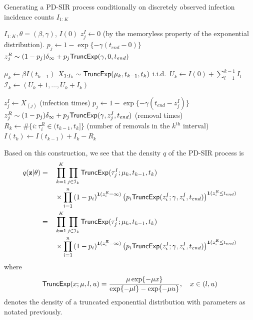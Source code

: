 \documentclass[11pt]{article}
\begin{document}
	\begin{algorithm}
		\caption{Generating a PD-SIR process conditionally on discretely observed infection incidence counts $I_{1:K}$}
		\label{alg:PD-SIR}
		\begin{algorithmic}
			\REQUIRE $I_{1:K}, \theta = (\beta, \gamma)$, $I(0)$
			\STATE $z^I_j \leftarrow 0$ (by the memoryless property of the exponential distribution).
			\STATE $p_j \leftarrow 1 - \exp\{-\gamma (t_{end} - 0)\}$
			\STATE $z^R_j \sim (1 - p_j) \delta_\infty + p_j \textsf{TruncExp}(\gamma, 0, t_{end})$
			\ENDFOR
			
			\STATE $\mu_k \leftarrow \beta I(t_{k-1})$
			\STATE $X_{1 : I_k} \sim \textsf{TruncExp}(\mu_k, t_{k-1}, t_k)$ i.i.d.\
			\STATE $U_k \leftarrow I(0) + \sum_{l=1}^{k-1} I_l$
			\STATE $\mathcal{I}_k \leftarrow (U_k + 1, \dots, U_k + I_k)$
			
			\STATE $z^I_j \leftarrow X_{(j)}$ (infection times)
			\STATE $p_j \leftarrow 1 - \exp\{-\gamma(t_{end} - z^I_j)\}$
			\STATE $z^R_j \sim (1 - p_j) \delta_\infty + p_j \textsf{TruncExp}(\gamma, z^I_j, t_{end})$ (removal times)
			\ENDFOR
			\STATE $R_k \leftarrow \#\{i:\tau^R_i \in (t_{k-1}, t_k]\}$ (number of removals in the $k^{\text{th}}$ interval)
			\STATE $I(t_k) \leftarrow I(t_{k-1}) + I_k - R_k$
			\ENDFOR
		\end{algorithmic}
	\end{algorithm}
	
	Based on this construction, we see that the density $q$ of the PD-SIR process is
	\begin{align*}
		q(\mathbf{z}|\theta) & = && \prod_{k=1}^K \prod_{j\in\mathcal{I}_k} \textsf{TruncExp}(\tau^I_j; \mu_{k}, t_{k-1}, t_{k}) \\
		& && \times \prod_{i=1}^{n} \left( 1 - p_i \right)^{\mathbf{1}(z^R_i = \infty)} \left( p_i \textsf{TruncExp}(z^I_i; \gamma, z^I_i, t_{end}) \right)^{\mathbf{1}(z^R_i \le t_{end})} \\
		& = && \prod_{k=1}^K \prod_{j\in\mathcal{I}_k} \textsf{TruncExp}(\tau^I_j; \mu_{k}, t_{k-1}, t_{k}) \\
		& && \times \prod_{i=1}^{n} \left( 1 - p_i \right)^{\mathbf{1}(z^R_i = \infty)} \left( p_i \textsf{TruncExp}(z^I_i; \gamma, z^I_i, t_{end}) \right)^{\mathbf{1}(z^R_i \le t_{end})}
	\end{align*}
	where %
	$$\textsf{TruncExp}(x; \mu, l, u) = \dfrac{\mu \exp\{-\mu x\}}{\exp\{-\mu l\} - \exp\{-\mu u\}}, \quad x \in (l, u)$$
	denotes the density of a truncated exponential distribution with parameters as notated previously.
	
\end{document}
